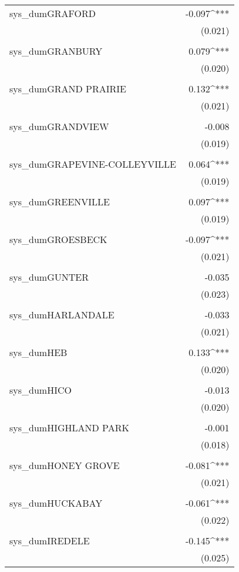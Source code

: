 \begin{table}[!htbp]
\begin{tabular}{@{\extracolsep{5pt}}lD{.}{.}{-3} }
 sys\_dumGRAFORD & -0.097^{***} \\ 
  & (0.021) \\ 
  & \\ 
 sys\_dumGRANBURY & 0.079^{***} \\ 
  & (0.020) \\ 
  & \\ 
 sys\_dumGRAND PRAIRIE & 0.132^{***} \\ 
  & (0.021) \\ 
  & \\ 
 sys\_dumGRANDVIEW & -0.008 \\ 
  & (0.019) \\ 
  & \\ 
 sys\_dumGRAPEVINE-COLLEYVILLE & 0.064^{***} \\ 
  & (0.019) \\ 
  & \\ 
 sys\_dumGREENVILLE & 0.097^{***} \\ 
  & (0.019) \\ 
  & \\ 
 sys\_dumGROESBECK & -0.097^{***} \\ 
  & (0.021) \\ 
  & \\ 
 sys\_dumGUNTER & -0.035 \\ 
  & (0.023) \\ 
  & \\ 
 sys\_dumHARLANDALE & -0.033 \\ 
  & (0.021) \\ 
  & \\ 
 sys\_dumHEB & 0.133^{***} \\ 
  & (0.020) \\ 
  & \\ 
 sys\_dumHICO & -0.013 \\ 
  & (0.020) \\ 
  & \\ 
 sys\_dumHIGHLAND PARK & -0.001 \\ 
  & (0.018) \\ 
  & \\ 
 sys\_dumHONEY GROVE & -0.081^{***} \\ 
  & (0.021) \\ 
  & \\ 
 sys\_dumHUCKABAY & -0.061^{***} \\ 
  & (0.022) \\ 
  & \\ 
 sys\_dumIREDELE & -0.145^{***} \\ 
  & (0.025) \\ 

\end{tabular}
\end{table}
